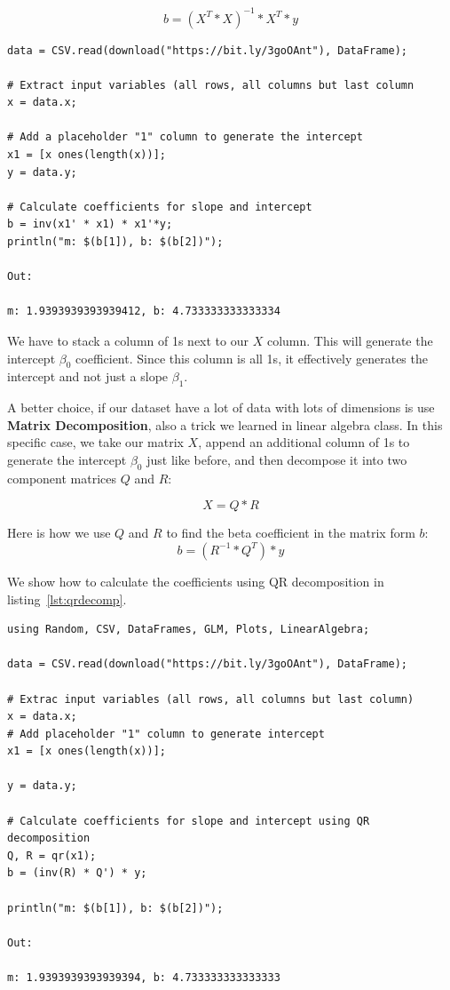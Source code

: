 \documentclass[a4paper, 11pt]{article}
\begin{document}
$$
b = (X^{T} * X)^{-1}*X^{T}*y
$$

\begin{lstlisting}[label={lst:inmat},caption={Using inverse and transposed matrices to fit a linear regression}]
data = CSV.read(download("https://bit.ly/3goOAnt"), DataFrame);

# Extract input variables (all rows, all columns but last column
x = data.x;

# Add a placeholder "1" column to generate the intercept
x1 = [x ones(length(x))];
y = data.y;

# Calculate coefficients for slope and intercept
b = inv(x1' * x1) * x1'*y;
println("m: $(b[1]), b: $(b[2])");

Out:

m: 1.9393939393939412, b: 4.733333333333334
\end{lstlisting}

We have to stack a column of 1s next to our $X$ column. This will generate the intercept $\beta_0$ coefficient. Since this column is all 1s, it effectively generates the intercept and not just a slope $\beta_1$.

A better choice, if our dataset have a lot of data with lots of dimensions is use \textbf{Matrix Decomposition}, also a trick we learned in linear algebra class. In this specific case, we take our matrix $X$, append an additional column of 1s to generate the intercept $\beta_0$ just like before, and then decompose it into two component matrices $Q$ and $R$:

$$
X = Q * R
$$

Here is how we use $Q$ and $R$ to find the beta coefficient in the matrix form $b$:
$$
b = (R^{-1}*Q^T)*y
$$

We show how to calculate the coefficients using QR decomposition in listing~\ref{lst:qrdecomp}.

\begin{lstlisting}[label={lst:qrdecomp},caption={Calculate coefficients for slope and intercept using QR decomposition}]
using Random, CSV, DataFrames, GLM, Plots, LinearAlgebra;

data = CSV.read(download("https://bit.ly/3goOAnt"), DataFrame);

# Extrac input variables (all rows, all columns but last column)
x = data.x;
# Add placeholder "1" column to generate intercept
x1 = [x ones(length(x))];

y = data.y;

# Calculate coefficients for slope and intercept using QR decomposition
Q, R = qr(x1);
b = (inv(R) * Q') * y;

println("m: $(b[1]), b: $(b[2])");

Out:

m: 1.9393939393939394, b: 4.733333333333333
\end{lstlisting}
\end{document}
